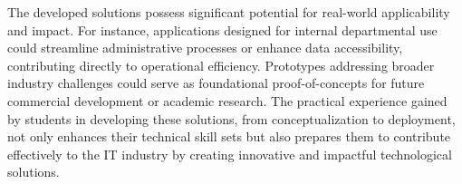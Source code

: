 \documentclass[11pt,a4paper]{article}
\newenvironment{card}{
    \begin{tcolorbox}[
        enhanced,
        colback=cardback,
        colframe=border,
        sharp corners,
        boxrule=0.5pt,
        drop shadow,
        drop shadow={shadow xshift=1mm,shadow yshift=-1mm,fill=border!50},
        boxsep=3mm,
        left=5mm, right=5mm, top=5mm, bottom=5mm,
        width=\textwidth,
        nobeforeafter
    ]
}{\end{tcolorbox}}
\begin{document}
\begin{card}
    The developed solutions possess significant potential for real-world applicability and impact. For instance, applications designed for internal departmental use could streamline administrative processes or enhance data accessibility, contributing directly to operational efficiency. Prototypes addressing broader industry challenges could serve as foundational proof-of-concepts for future commercial development or academic research. The practical experience gained by students in developing these solutions, from conceptualization to deployment, not only enhances their technical skill sets but also prepares them to contribute effectively to the IT industry by creating innovative and impactful technological solutions.
\end{card}

\vspace{0.5cm}
\end{document}
